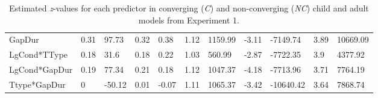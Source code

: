 \documentclass[authoryear, 12pt]{elsarticle}
\begin{document}
\begin{table}
\begin{scriptsize}
\begin{tabular}{lllllllllll}
		GapDur			&	0.31	&	97.73	&	0.32	&	0.38	&	1.12	&	1159.99	&	-3.11		&	-7149.74	&	3.89	&	10669.09 \\
		LgCond*TType	&	0.18	&	31.6	&	0.18	&	0.22	&	1.03	&	560.99	&	-2.87		&	-7722.35	&	3.9		&	4377.92 \\
		LgCond*GapDur	&	0.19	&	77.34	&	0.21	&	0.18	&	1.12	&	1047.37	&	-4.18		&	-7713.96	&	3.71	&	7764.19 \\
		Ttype*GapDur	&	0		&	-50.12	&	0.01	&	-0.07	&	1.11	&	1065.37	&	-3.42		&	-10640.42	&	3.64	&	7868.74 \\
    \hline
  \end{tabular}
  \caption{Estimated \textit{z}-values for each predictor in converging (\textit{C}) and non-converging (\textit{NC}) child and adult models from Experiment 1. }
\label{tab:nonconv_e1}
 \end{scriptsize}
\end{table}
\end{document}
